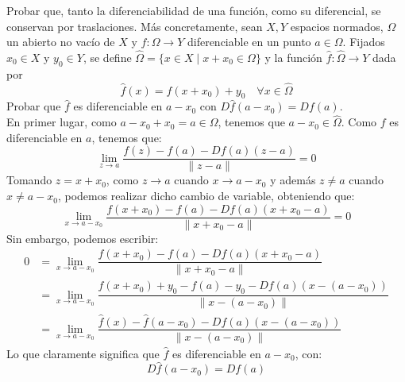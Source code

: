 \begin{ejercicio}
Probar que, tanto la diferenciabilidad de una función, como su diferencial, se conservan por traslaciones. Más concretamente, sean \( X, Y \) espacios normados, \( \Omega \) un abierto no vacío de \( X \) y \( f : \Omega \rightarrow Y \) diferenciable en un punto \( a \in \Omega \). Fijados \( x_0 \in X \) y \( y_0 \in Y \), se define \( \hat{\Omega} = \{x \in X\mid x + x_0 \in \Omega\} \) y la función \( \hat{f} : \hat{\Omega} \rightarrow Y \) dada por
\[
\hat{f}(x) = f(x + x_0) + y_0 \quad \forall x \in \hat{\Omega}
\]
Probar que \( \hat{f} \) es diferenciable en \( a - x_0 \) con \( D\hat{f}(a - x_0) = Df(a) \).\\

\noindent
En primer lugar, como $a-x_0+x_0 = a\in \Omega$, tenemos que $a-x_0 \in \hat{\Omega}$. Como $f$ es diferenciable en $a$, tenemos que:
\begin{equation*}
    \lim_{z\to a} \dfrac{f(z)-f(a)-Df(a)(z-a)}{\|z-a\|} = 0
\end{equation*}
Tomando $z = x+x_0$, como $z\to a$ cuando $x\to a-x_0$ y además $z\neq a$ cuando $x\neq a-x_0$, podemos realizar dicho cambio de variable, obteniendo que:
\begin{equation*}
    \lim_{x\to a-x_0} \dfrac{f(x+x_0)-f(a)-Df(a)(x+x_0-a)}{\|x+x_0-a\|} = 0
\end{equation*}
Sin embargo, podemos escribir:
\begin{align*}
    0 &= \lim_{x\to a-x_0} \dfrac{f(x+x_0)-f(a)-Df(a)(x+x_0-a)}{\|x+x_0-a\|}  \\
      &= \lim_{x\to a-x_0}\dfrac{f(x+x_0)+y_0 - f(a)-y_0 - Df(a)(x-(a-x_0))}{\|x-(a-x_0)\|}  \\
      &= \lim_{x\to a-x_0}\dfrac{\hat{f}(x) - \hat{f}(a-x_0) - Df(a)(x-(a-x_0))}{\|x-(a-x_0)\|} 
\end{align*}
Lo que claramente significa que $\hat{f}$ es diferenciable en $a-x_0$, con:
\begin{equation*}
    D\hat{f}(a-x_0) = Df(a)
\end{equation*}
\end{ejercicio}

